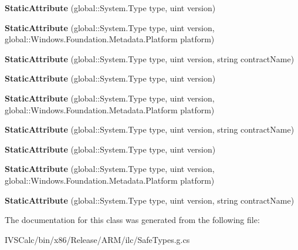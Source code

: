 \begin{DoxyCompactItemize}
{\bfseries Static\+Attribute} (global\+::\+System.\+Type type, uint version)
\item 
\mbox{\label{class_windows_1_1_foundation_1_1_metadata_1_1_static_attribute_a8c73e44abb883e812d4447c06e986be7}} 
{\bfseries Static\+Attribute} (global\+::\+System.\+Type type, uint version, global\+::\+Windows.\+Foundation.\+Metadata.\+Platform platform)
\item 
\mbox{\label{class_windows_1_1_foundation_1_1_metadata_1_1_static_attribute_ab58963b833fb6f70c5f34aedfc65c4df}} 
{\bfseries Static\+Attribute} (global\+::\+System.\+Type type, uint version, string contract\+Name)
\item 
\mbox{\label{class_windows_1_1_foundation_1_1_metadata_1_1_static_attribute_afddbe5fa0518878f972aa5b00c32fd30}} 
{\bfseries Static\+Attribute} (global\+::\+System.\+Type type, uint version)
\item 
\mbox{\label{class_windows_1_1_foundation_1_1_metadata_1_1_static_attribute_a8c73e44abb883e812d4447c06e986be7}} 
{\bfseries Static\+Attribute} (global\+::\+System.\+Type type, uint version, global\+::\+Windows.\+Foundation.\+Metadata.\+Platform platform)
\item 
\mbox{\label{class_windows_1_1_foundation_1_1_metadata_1_1_static_attribute_ab58963b833fb6f70c5f34aedfc65c4df}} 
{\bfseries Static\+Attribute} (global\+::\+System.\+Type type, uint version, string contract\+Name)
\item 
\mbox{\label{class_windows_1_1_foundation_1_1_metadata_1_1_static_attribute_afddbe5fa0518878f972aa5b00c32fd30}} 
{\bfseries Static\+Attribute} (global\+::\+System.\+Type type, uint version)
\item 
\mbox{\label{class_windows_1_1_foundation_1_1_metadata_1_1_static_attribute_a8c73e44abb883e812d4447c06e986be7}} 
{\bfseries Static\+Attribute} (global\+::\+System.\+Type type, uint version, global\+::\+Windows.\+Foundation.\+Metadata.\+Platform platform)
\item 
\mbox{\label{class_windows_1_1_foundation_1_1_metadata_1_1_static_attribute_ab58963b833fb6f70c5f34aedfc65c4df}} 
{\bfseries Static\+Attribute} (global\+::\+System.\+Type type, uint version, string contract\+Name)
\end{DoxyCompactItemize}


The documentation for this class was generated from the following file\+:\begin{DoxyCompactItemize}
\item 
I\+V\+S\+Calc/bin/x86/\+Release/\+A\+R\+M/ilc/Safe\+Types.\+g.\+cs\end{DoxyCompactItemize}

